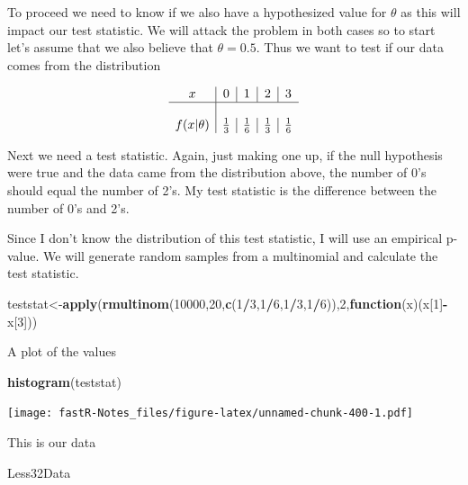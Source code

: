 \documentclass[]{book}
\newenvironment{Shaded}{\begin{snugshade}}{\end{snugshade}}
\newcommand{\KeywordTok}[1]{\textcolor[rgb]{0.13,0.29,0.53}{\textbf{#1}}}
\newcommand{\DecValTok}[1]{\textcolor[rgb]{0.00,0.00,0.81}{#1}}
\newcommand{\ControlFlowTok}[1]{\textcolor[rgb]{0.13,0.29,0.53}{\textbf{#1}}}
\newcommand{\OperatorTok}[1]{\textcolor[rgb]{0.81,0.36,0.00}{\textbf{#1}}}
\newcommand{\NormalTok}[1]{#1}
\theoremstyle{definition}
\theoremstyle{definition}
\theoremstyle{definition}
\theoremstyle{remark}
\begin{document}
To proceed we need to know if we also have a hypothesized value for
\(\theta\) as this will impact our test statistic. We will attack the
problem in both cases so to start let's assume that we also believe that
\(\theta = 0.5\). Thus we want to test if our data comes from the
distribution

\[
\begin{array}{c|c|c|c|c} 
x & 0 & 1 & 2 & 3 \\ \hline \\ f(x|\theta) & {1 \over 3} & {1 \over 6} & {1 \over 3} & {1 \over 6}
\end{array} 
\]

Next we need a test statistic. Again, just making one up, if the null
hypothesis were true and the data came from the distribution above, the
number of 0's should equal the number of 2's. My test statistic is the
difference between the number of 0's and 2's.

Since I don't know the distribution of this test statistic, I will use
an empirical p-value. We will generate random samples from a multinomial
and calculate the test statistic.

\begin{Shaded}
\begin{Highlighting}[]
\NormalTok{teststat<-}\KeywordTok{apply}\NormalTok{(}\KeywordTok{rmultinom}\NormalTok{(}\DecValTok{10000}\NormalTok{,}\DecValTok{20}\NormalTok{,}\KeywordTok{c}\NormalTok{(}\DecValTok{1}\OperatorTok{/}\DecValTok{3}\NormalTok{,}\DecValTok{1}\OperatorTok{/}\DecValTok{6}\NormalTok{,}\DecValTok{1}\OperatorTok{/}\DecValTok{3}\NormalTok{,}\DecValTok{1}\OperatorTok{/}\DecValTok{6}\NormalTok{)),}\DecValTok{2}\NormalTok{,}\ControlFlowTok{function}\NormalTok{(x)(x[}\DecValTok{1}\NormalTok{]}\OperatorTok{-}\NormalTok{x[}\DecValTok{3}\NormalTok{]))}
\end{Highlighting}
\end{Shaded}

A plot of the values

\begin{Shaded}
\begin{Highlighting}[]
\KeywordTok{histogram}\NormalTok{(teststat)}
\end{Highlighting}
\end{Shaded}

\texttt{[image: fastR-Notes\_files/figure-latex/unnamed-chunk-400-1.pdf]}

This is our data

\begin{Shaded}
\begin{Highlighting}[]
\NormalTok{Less32Data}
\end{Highlighting}
\end{Shaded}
\end{document}
